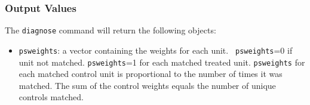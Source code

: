 \documentclass[oneside,letterpaper,titlepage]{article}
\begin{document}
\begin{appendix}
\subsubsection{Output Values}
The \texttt{diagnose} command will return the following objects: 
\begin{itemize}
\item \texttt{psweights}: a vector containing the weights for each unit.  {\tt
    psweights}=0 if unit not matched.  {\tt psweights}=1 for each matched
  treated unit.  {\tt psweights} for each matched control unit is
  proportional to the number of times it was matched.  The sum of the control
  weights equals the number of unique controls matched.
\end{itemize}

\end{appendix}





\printindex
\end{document}
